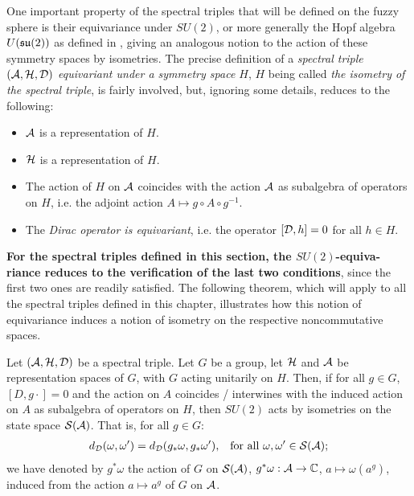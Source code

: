 One important property of the spectral triples that will be defined on the fuzzy sphere is their equivariance under $SU(2)$, or more generally the Hopf algebra $U(\mathfrak{su}(2))$ as defined in \cite{Sitarz}, giving an analogous notion to the action of these symmetry spaces by isometries. The precise definition of a \textit{spectral triple $(\mathcal A, \mathcal H, \mathcal D)$ equivariant under a symmetry space $H$}, $H$ being called \textit{the isometry of the spectral triple}, is fairly involved, but, ignoring some details, reduces to the following:
    \begin{itemize}
    
    \item $\mathcal A$ is a representation of $H$.
    
    \item $\mathcal H $ is a representation of $H$.
    
    \item The action of $H$ on $\mathcal A$ coincides with the action $\mathcal A$ as subalgebra of operators on $H$, i.e. the adjoint action $A \mapsto g \circ A \circ g^{-1}$. %
    
    \item The \textit{Dirac operator is equivariant}, i.e. the operator $[\mathcal D, h] = 0$ for all $h \in H$.
    
    \end{itemize}

\textbf{For the spectral triples defined in this section, the $SU(2)$-equiva- riance reduces to the verification of the last two conditions}, since the first two ones are readily satisfied. The following theorem, which will apply to all the spectral triples defined in this chapter, illustrates how this notion of equivariance induces a notion of isometry on the respective noncommutative spaces.

\begin{theorem} \label{theoGInvariantDistance}
Let $(\mathcal A, \mathcal H, \mathcal D)$ be a spectral triple. Let $G$ be a group, let $\mathcal H$ and $\mathcal A$ be representation spaces of $G$, with $G$ acting unitarily on $H$. Then, if for all $g \in G$, $[D, g\cdot] = 0$ and the action on $A$ coincides / interwines with the induced action on $A$ as subalgebra of operators on $H$, then $SU(2)$ acts by isometries on the state space $\mathcal S(\mathcal A)$. That is, for all $g \in G$:
\begin{align}
    d_\mathcal D(\omega, \omega') &= d_\mathcal D(g_* \omega, g_*\omega'), & \text{for all $\omega, \omega' \in \mathcal S(\mathcal A)$};
\end{align}
we have denoted by $g^*\omega$ the action of $G$ on $\mathcal S(\mathcal A)$, $g^* \omega: \mathcal A \to \mathbb{C}$, $a \mapsto \omega(a^g)$, induced from the action $a \mapsto a^g$ of $G$ on $\mathcal A$.
\end{theorem}

